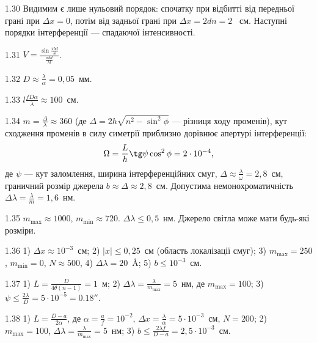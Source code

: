\begin{Solution}{1.{30}}
	Видимим є лише нульовий порядок: спочатку при відбитті від передньої грані
	при $ \Delta x = 0 $, потім від задньої грані при $ \Delta  x = 2dn = 2 $~ см. Наступні порядки
	інтерференції --- спадаючої інтенсивності.
\end{Solution}
\begin{Solution}{1.{31}}
	$V = \frac{\sin\frac{\pi b d}{\lambda l}}{\frac{\pi b d}{\lambda l}}$.
\end{Solution}
\begin{Solution}{1.{32}}
	$D \approx \frac{\lambda}{\alpha} = 0,05$~мм.
\end{Solution}
\begin{Solution}{1.{33}}
	$ l \frac{fD\alpha}{\lambda} \approx 100$~см.
\end{Solution}
\begin{Solution}{1.{34}}
	$m = \frac{\Delta}{\lambda} \approx 360$ (де $\Delta = 2h\sqrt{n^2 - \sin^2\phi}$ --- різниця ходу променів), кут сходження променів в силу симетрії приблизно дорівнює апертурі інтерференції:
	\begin{equation*}
		\Omega = \frac{L}{h} \tg\psi\cos^2\phi = 2\cdot10^{-4},
	\end{equation*}
	де $\psi$ --- кут заломлення, ширина інтерференційних смуг, $\Delta \approx \frac{\lambda}{\omega} = 2,8$~см, граничний розмір джерела $b \approx \Delta \approx 2,8$~см. Допустима немонохроматичність
	$ \Delta\lambda =  \frac{\lambda}{m} = 1,6 $~нм.
\end{Solution}
\begin{Solution}{1.{35}}
	$ m_{\max} \approx 1000$, $ m_{\min} \approx 720 $. $ \Delta\lambda \le 0,5 $~нм. Джерело світла може мати будь-які розміри.
\end{Solution}
\begin{Solution}{1.{36}}
	1) $\Delta x \approx 10^{-3}$~см; 2) $|x| \le 0,25$~см (область локалізації смуг); 3) $ m_{\max} = 250$, $ m_{\min} = 0$, $N \approx 500$, 4) $\Delta\lambda = 20$~\AA; 5) $ b \le 10^{-3}$~см.
\end{Solution}
\begin{Solution}{1.{37}}
	1) $L = \frac{D}{4\theta (n - 1)} = 1$~м; 2) $ \Delta\lambda = \frac{\lambda}{m_{\max}} = 5$~нм, де $m_{\max} = 100$; 3) $\psi \le \frac{2\lambda}{D} = 5\cdot10^{-5} = 0.18''$.
\end{Solution}
\begin{Solution}{1.{38}}
	1) $L = \frac{D - a}{2\alpha}$, де $\alpha = \frac{a}{f} = 10^{-2}$, $ \Delta x  = \frac{\lambda}{\alpha} = 5\cdot10^{-3}$~см, $N = 200$; 2) $m_{\max} = 100$,  $ \Delta\lambda = \frac{\lambda}{m_{\max}} = 5$~нм; 3) $b \le \frac{2\lambda f}{D - a} = 2,5\cdot10^{-3}$~см.
\end{Solution}
